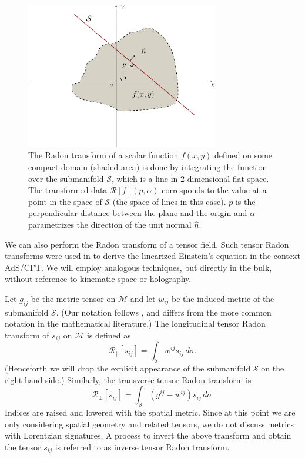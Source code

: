 \documentclass[%
12pt,preprint,
nofootinbib,
amsmath,amssymb,
aps,
prd,
showpacs,
superscriptaddress
]{revtex4-2}
\newcommand{\R}{\mathscr{R}}
\begin{document}
\begin{figure}
 \includegraphics[width=0.75\textwidth]{xraytransform.pdf}
\caption{The Radon transform of a scalar function $f(x,y)$ defined on some compact domain (shaded area) is done by integrating the function over the submanifold $\mathcal{S}$, which is a line in 2-dimensional flat space. The transformed data $\R[f](p,\alpha)$ corresponds to the value at a point in the space of $\mathcal{S}$ (the space of lines in this case). $p$ is the perpendicular distance between the plane and the origin and $\alpha$ parametrizes the direction of the unit normal $\hat{n}$.
}
\label{fig:xraytransform}
\end{figure}

We can also perform the Radon transform of a tensor field.
Such tensor Radon transforms were used in  \cite{Czech:2016tqr} to derive the linearized Einstein's equation in the context AdS/CFT. 
We will employ analogous techniques, but directly in the bulk, without reference to kinematic space or holography. 

Let $g_{ij}$ be the metric tensor on $\mathcal{M}$ and let $w_{ij}$ be the induced metric of the submanifold $\mathcal{S}$. 
(Our notation follows \cite{Czech:2016tqr}, and differs from the more common notation in the mathematical literature.)
The longitudinal tensor Radon transform of $s_{ij}$ on $\mathcal{M}$ is defined as
\begin{equation}
\R_{\parallel} [s_{ij}] = \int_{\mathcal{S}} w^{ij} s_{ij}\, d\sigma.
\label{eq:Rparallel}
\end{equation}
(Henceforth we will drop the explicit appearance of the submanifold $\mathcal{S}$ on the right-hand side.)
Similarly, the transverse tensor Radon transform is
\begin{equation}
\R_{\bot}[s_{ij}] = \int_{\mathcal{S}} (g^{ij}-w^{ij}) s_{ij}\, d\sigma.
\end{equation}
Indices are raised and lowered with the spatial metric. Since at this point we are only considering spatial geometry and related tensors, we do not discuss metrics with Lorentzian signatures. 
A process to invert the above transform and obtain the tensor $s_{ij}$ is referred to as inverse tensor Radon transform. 
\end{document}

